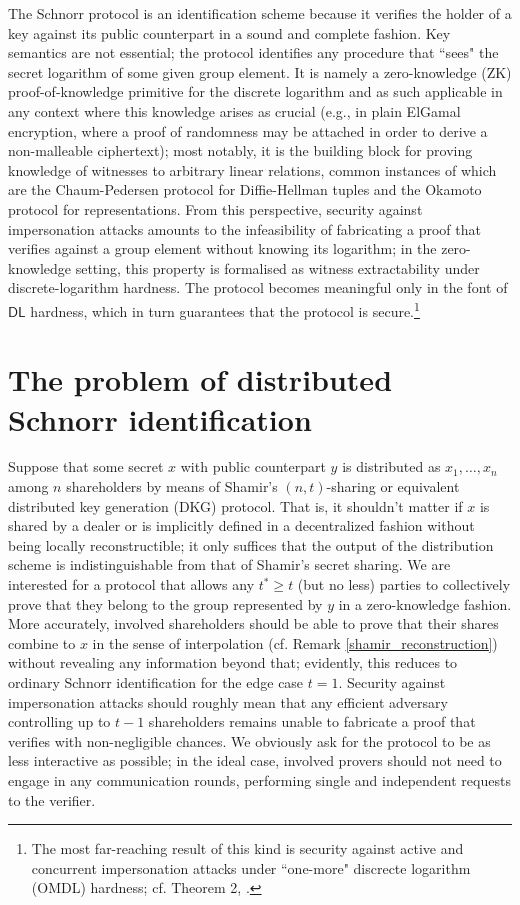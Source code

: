 \documentclass{iacrtrans}
\begin{document}
The Schnorr protocol is an identification scheme
because it verifies the holder of a key
against its public counterpart in a sound and complete fashion.
Key semantics are not essential;
the protocol identifies any procedure
that ``sees" the secret logarithm of some given group element.
It is namely a zero-knowledge (ZK) proof-of-knowledge primitive
for the discrete logarithm and as such applicable in any context where this knowledge arises as crucial
(e.g., in plain ElGamal encryption,
where a proof of randomness
may be attached in order to derive a non-malleable ciphertext);
most notably, it is the building block
for proving knowledge of witnesses to arbitrary linear relations,
common instances of which are
the Chaum-Pedersen protocol for Diffie-Hellman tuples
and the Okamoto protocol for representations.
From this perspective,
security against impersonation attacks
amounts to the infeasibility of fabricating
a proof that verifies against a group element
without knowing its logarithm;
in the zero-knowledge setting,
this property is formalised as witness extractability
under discrete-logarithm hardness.
The protocol becomes meaningful
only in the font of $\mathsf{DL}$ hardness,
which in turn guarantees
that the protocol is secure.\footnote{The
most far-reaching result of this kind is
security against active and concurrent impersonation attacks
under ``one-more" discrecte logarithm (OMDL) hardness;
cf. Theorem 2, \cite{paper_bellare_palacio}.}

\section{The problem of distributed Schnorr identification}\label{section_problem}

Suppose that some secret $x$
with public counterpart $y$ is distributed as $x_1, \dots, x_n$
among $n$ shareholders by means of Shamir's $(n, t)$-sharing
or equivalent distributed key generation (DKG)
protocol. That is, it shouldn't matter if $x$ is shared by
a dealer or is implicitly defined in a decentralized
fashion without being locally reconstructible;
it only suffices that the output of the
distribution scheme is indistinguishable
from that of Shamir's secret sharing.
We are interested for a protocol that allows any
$t^* \ge t$ (but no less) parties to collectively prove
that they belong to the group represented by $y$
in a zero-knowledge fashion. More accurately, involved shareholders
should be able to prove that their shares
combine to $x$ in the sense of interpolation
(cf. Remark \ref{shamir_reconstruction})
without revealing any information beyond that;
evidently, this reduces to ordinary Schnorr identification
for the edge case $t=1$.
Security against impersonation attacks should roughly mean that any
efficient adversary controlling up to $t-1$ shareholders
remains unable to fabricate a proof that verifies
with non-negligible chances.
We obviously ask for the protocol to be
as less interactive as possible;
in the ideal case, involved provers should not need to
engage in any communication rounds, performing single and
independent requests to the verifier.
\end{document}
